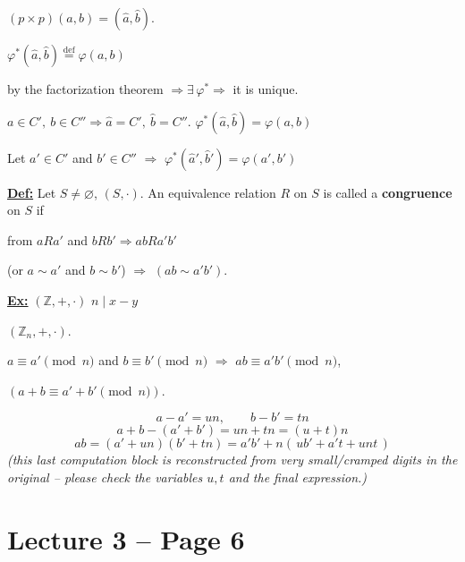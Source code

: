 \noindent $(p\times p)(a,b) = (\hat a,\hat b)$.

\noindent $\varphi^*(\hat a,\hat b) \overset{\text{def}}{=} \varphi(a,b)$

\noindent by the factorization theorem $\Rightarrow \exists\, \varphi^* \Rightarrow$ it is unique.

\begin{center}
\end{center}

\noindent $a\in C',\ b\in C'' \Rightarrow \hat a = C',\ \hat b = C''$. \quad $\varphi^*(\hat a,\hat b) = \varphi(a,b)$

\noindent Let $a'\in C'$ and $b'\in C''$ $\Rightarrow$ $\varphi^*(\hat a',\hat b') = \varphi(a',b')$

\bigskip
\noindent\underline{\textbf{Def:}} Let $S\neq\varnothing$, $(S,\cdot)$. An equivalence relation $R$ on $S$ is called a \textbf{congruence} on $S$ if

\noindent from $aRa'$ and $bRb' \Rightarrow abRa'b'$

\noindent (or $a\sim a'$ and $b\sim b'$) $\Rightarrow$ $(ab\sim a'b')$.

\bigskip
\noindent\underline{\textbf{Ex:}} $(\mathbb{Z},+,\cdot)$ \qquad $n \mid x-y$

\noindent $(\mathbb{Z}_n,+,\cdot)$.

\noindent $a\equiv a' \pmod n$ and $b\equiv b' \pmod n$ $\Rightarrow$ $ab\equiv a'b' \pmod n$,

\noindent $(a+b\equiv a'+b' \pmod n)$.

\[
a-a' = un,\qquad b-b'=tn
\]
\[
a+b-(a'+b') = un+tn = (u+t)n
\]
\[
ab = (a'+un)(b'+tn) = a'b' + n(\,ub'+a't+unt\,)
\]
\noindent\textit{(this last computation block is reconstructed from very small/cramped digits in the original -- please check the variables $u,t$ and the final expression.)}






\section*{Lecture 3 -- Page 6}

